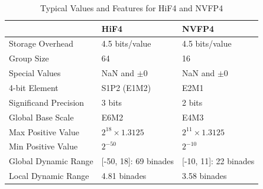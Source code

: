 \begin{table}[tbp]
  \caption{Typical Values and Features for HiF4 and NVFP4}
  \label{HiF4-NVFP4}
  \centering
  \begin{tabular}{lll}
    \toprule 
     & HiF4 & NVFP4 \\
    \midrule
    Storage Overhead      & 4.5 bits/value & 4.5 bits/value \\
    Group Size            & 64             & 16             \\
    Special Values        & NaN and $\pm 0$& NaN and $\pm 0$\\
    4-bit Element         & S1P2 (E1M2)    & E2M1           \\
    Significand Precision & 3 bits         & 2 bits         \\
    Global Base Scale     & E6M2           & E4M3           \\
    Max Positive Value    & $2^{18}\times1.3125$ & $2^{11}\times1.3125$ \\
    Min Positive Value    & $2^{-50}$ & $2^{-10}$ \\
    Global Dynamic Range  & [-50, 18]: 69 binades  & [-10, 11]: 22 binades \\
    Local Dynamic Range   & 4.81 binades   & 3.58 binades   \\
    \bottomrule
  \end{tabular}
\end{table}